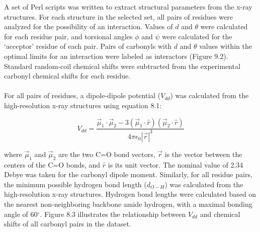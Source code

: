 \begin{doublespace}
A set of Perl scripts was written to extract structural parameters from
the x-ray structures. For each structure in the selected set, all pairs of
residues were analyzed for the possibility of an \npistar{} interaction. Values
of $d$ and $\theta$ were calculated for each residue pair, and torsional angles
$\phi$ and $\psi$ were calculated for the `acceptor' residue of each pair.
Pairs of carbonyls with $d$ and $\theta$ values within the optimal limits for
an \npistar{} interaction were labeled as interactors (Figure 9.2). Standard
random-coil chemical shifts were subtracted from the experimental carbonyl
\cnmr{} chemical shifts for each residue.
\\\\
For all pairs of residues, a dipole-dipole potential ($V_{dd}$) was calculated
from the high-resolution x-ray structures using equation 8.1:

\begin{equation}
V_{dd} = \frac{
  \vec{\mu}_1 \cdot \vec{\mu}_2 - 3 
    (\vec{\mu}_1 \cdot \hat{r})
    (\vec{\mu}_2 \cdot \hat{r})}{
  4 \pi \epsilon_0 |\vec{r}|^3}
\end{equation}

where $\vec{\mu}_1$ and $\vec{\mu}_2$ are the two C=O bond vectors, $\vec{r}$
is the vector between the centers of the C=O bonds, and $\hat{r}$ is its unit
vector. The nominal value of 2.34 Debye was taken for the carbonyl dipole
moment. Similarly, for all residue pairs, the minimum possible hydrogen bond
length ($d_{O-H}$) was calculated from the high-resolution x-ray structures.
Hydrogen bond lengths were calculated based on the nearest non-neighboring
backbone amide hydrogen, with a maximal bonding angle of 60$^\circ$. Figure
8.3 illustrates the relationship between $V_{dd}$ and \cnmr{} chemical shifts
of all carbonyl pairs in the dataset.
\end{doublespace}

